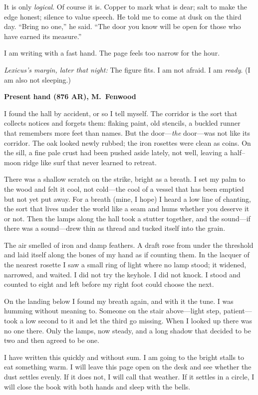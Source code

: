 \documentclass[11pt]{article}
\numberwithin{equation}{section} %
\theoremstyle{plain} %
\theoremstyle{definition} %
\theoremstyle{remark} %
\begin{document}
It is only \emph{logical}. Of course it is. Copper to mark what is dear; salt to make the edge honest; silence to value speech. He told me to come at dusk on the third day. “Bring no one,” he said. “The door you know will be open for those who have earned its measure.”

I am writing with a fast hand. The page feels too narrow for the hour.

\medskip
\noindent\textit{Lexicus’s margin, later that night:} The figure fits. I am not afraid. I am \emph{ready}. (I am also not sleeping.)

\medskip
\noindent\textbf{Present hand (876 AR), M.\ Fenwood}

I found the hall by accident, or so I tell myself. The corridor is the sort that collects notices and forgets them: flaking paint, old stencils, a buckled runner that remembers more feet than names. But the door—\emph{the} door—was not like its corridor. The oak looked newly rubbed; the iron rosettes were clean as coins. On the sill, a fine pale crust had been pushed aside lately, not well, leaving a half–moon ridge like surf that never learned to retreat.

There was a shallow scratch on the strike, bright as a breath. I set my palm to the wood and felt it cool, not cold—the cool of a vessel that has been emptied but not yet put away. For a breath (mine, I hope) I heard a low line of chanting, the sort that lives under the world like a seam and hums whether you deserve it or not. Then the lamps along the hall took a stutter together, and the sound—if there was a sound—drew thin as thread and tucked itself into the grain.

The air smelled of iron and damp feathers. A draft rose from under the threshold and laid itself along the bones of my hand as if counting them. In the lacquer of the nearest rosette I saw a small ring of light where no lamp stood; it widened, narrowed, and waited. I did not try the keyhole. I did not knock. I stood and counted to eight and left before my right foot could choose the next.

On the landing below I found my breath again, and with it the tune. I was humming without meaning to. Someone on the stair above—light step, patient—took a low second to it and let the third go missing. When I looked up there was no one there. Only the lamps, now steady, and a long shadow that decided to be two and then agreed to be one.

I have written this quickly and without sum. I am going to the bright stalls to eat something warm. I will leave this page open on the desk and see whether the dust settles evenly. If it does not, I will call that weather. If it settles in a circle, I will close the book with both hands and sleep with the bells.
\end{document}
